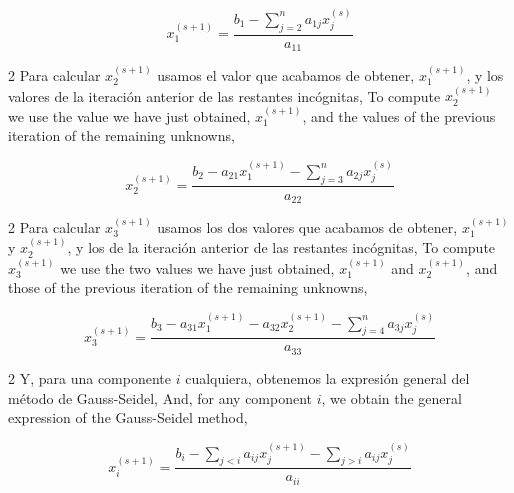 \begin{equation*}
x_1^{(s+1)}=\frac{b_1-\sum_{j=2}^n a_{1j}x_j^{(s)}}{a_{11}}
\end{equation*}

\begin{paracol}{2}
Para calcular $x_2^{(s+1)}$ usamos el valor que acabamos de obtener, $x_1^{(s+1)}$, y los valores de la iteración anterior de las restantes incógnitas,
\switchcolumn
To compute $x_2^{(s+1)}$ we use the value we have just obtained, $x_1^{(s+1)}$, and the values of the previous iteration of the remaining unknowns,
\end{paracol}
\begin{equation*}
x_2^{(s+1)}=\frac{b_2-a_{21}x_1^{(s+1)}-\sum_{j=3}^na_{2j}x_j^{(s)}}{a_{22}}
\end{equation*}
\begin{paracol}{2}
Para calcular $x_3^{(s+1)}$ usamos los dos valores que acabamos de obtener, $x_1^{(s+1)}$ y $x_2^{(s+1)}$, y los de la iteración anterior de las restantes incógnitas,
\switchcolumn
To compute $x_3^{(s+1)}$ we use the two values we have just obtained, $x_1^{(s+1)}$ and $x_2^{(s+1)}$, and those of the previous iteration of the remaining unknowns,
\end{paracol}

\begin{equation*}
x_3^{(s+1)}=\frac{b_3-a_{31}x_1^{(s+1)}-a_{32}x_2^{(s+1)}-\sum_{j=4}^na_{3j}x_j^{(s)}}{a_{33}}
\end{equation*}
\begin{paracol}{2}
Y, para una componente $i$ cualquiera, obtenemos la expresión general del método de Gauss-Seidel,
\switchcolumn
And, for any component $i$, we obtain the general expression of the Gauss-Seidel method,
\end{paracol}

\begin{equation*}
x_i^{(s+1)}=\frac{b_i-\sum_{j< i}a_{ij}x_j^{(s+1)}-\sum_{j> i}a_{ij}x_j^{(s)}}{a_{ii}}
\end{equation*}

